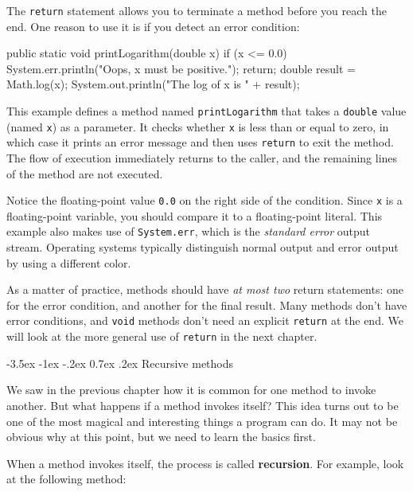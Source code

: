 \documentclass[12pt]{book}
\makeatletter
\renewcommand{\section}{\@startsection {section}{1}{\z@}%
    {-3.5ex \@plus -1ex \@minus -.2ex}%
    {0.7ex \@plus.2ex}%
    {\normalfont\Large\bfseries}}
\theoremstyle{exercise}
\newcommand{\java}[1]{\lstinline{#1}} %
\makeatother
\begin{document}
The \java{return} statement allows you to terminate a method before you reach the end.
One reason to use it is if you detect an error condition:

\begin{code}
    public static void printLogarithm(double x) {
        if (x <= 0.0) {
            System.err.println("Oops, x must be positive.");
            return;
        }
        double result = Math.log(x);
        System.out.println("The log of x is " + result);
    }
\end{code}

This example defines a method named \java{printLogarithm} that takes a \java{double} value (named \java{x}) as a parameter.
It checks whether \java{x} is less than or equal to zero, in which case it prints an error message and then uses \java{return} to exit the method.
The flow of execution immediately returns to the caller, and the remaining lines of the method are not executed.


Notice the floating-point value \java{0.0} on the right side of the condition.
Since \java{x} is a floating-point variable, you should compare it to a floating-point literal.
This example also makes use of \java{System.err}, which is the {\it standard error} output stream.
Operating systems typically distinguish normal output and error output by using a different color.

As a matter of practice, methods should have {\it at most two} return statements: one for the error condition, and another for the final result.
Many methods don't have error conditions, and \java{void} methods don't need an explicit \java{return} at the end.
We will look at the more general use of \java{return} in the next chapter.


\section{Recursive methods}
\label{recursion}


We saw in the previous chapter how it is common for one method to invoke another.
But what happens if a method invokes itself?
This idea turns out to be one of the most magical and interesting things a program can do.
It may not be obvious why at this point, but we need to learn the basics first.


When a method invokes itself, the process is called {\bf recursion}.
For example, look at the following method:
\end{document}

